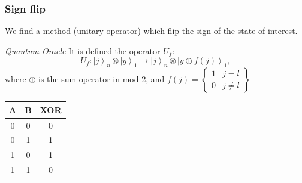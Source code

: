 \begin{frame}
	\frametitle{Sign flip}
	We find a method (unitary operator) which flip the sign of the state of interest.
	\pause
	\begin{block}{\textit{Quantum Oracle}}
		It is defined the operator $U_f$: 
		\[U_{f}:\left.|j\right\rangle _{n}\otimes\left.|y\right\rangle _{1}\rightarrow\left.|j\right\rangle _{n}\otimes\left.|y\oplus f\left(j\right)\right\rangle _{1},\]
		where $\oplus$ is the sum operator in mod 2, and $f\left(j\right)=\left\{ \begin{array}{cc}
		1  & j=l\\
		0  & j\neq l
		\end{array}\right\} $
	\end{block}
	
	
	\begin{center}
		\begin{tabular}{|c c |c|} 
			\hline
			A & B & XOR \\ 
			\hline\hline
			0&0&0  \\ 
			\hline
			0&1&1  \\ 
			\hline
			1&0&1  \\
			\hline
			1&1&0 \\
			\hline
		\end{tabular}
	\end{center}
\end{frame}

